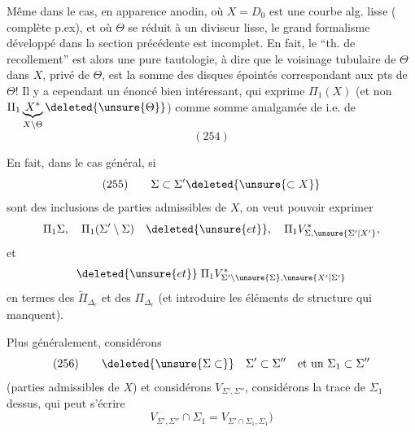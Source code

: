  Même dans le cas, en apparence anodin, où $X=D_0$ est une courbe alg.  lisse ( complète p.ex), et où $\Theta$ se réduit à un diviseur lisse, le grand formalisme développé dans la section précédente est incomplet. En fait, le ``th. de recollement'' est alors une pure tautologie,     à dire que le voisinage tubulaire de $\Theta$ dans $X$, privé de $\Theta$, est la somme des  disques épointés correspondant aux pts de $\Theta$! Il y a cependant un énoncé bien intéressant, qui exprime \deleted{$\unsure{\Pi}$} $\Pi_1(X)$ (et non $\Pi_1\underbrace{X^*}_{X\setminus\Theta}\deleted{\unsure{\Theta}}$) comme somme amalgamée de
i.e. de
\[
(254)
\]
\margin{--}


En fait, dans le cas général, si
\[
(255)\qquad\Sigma\subset\Sigma'\deleted{\unsure{\subset X}}
\]
sont des inclusions de parties admissibles de $X$, on veut pouvoir exprimer
\[
\Pi_1\Sigma,\quad\Pi_1(\Sigma'\setminus\Sigma)\quad\deleted{\unsure{et}},\quad
\Pi_1V^*_{\Sigma,\unsure{\Sigma'|X'}},
\]
et  
\[
\deleted{\unsure{et}}\;\Pi_1V^*_{\Sigma'\setminus\unsure{\Sigma},\unsure{X'|\Sigma'}}
\]
en termes des $\widetilde\Pi_{\Delta_r}$ et des $\Pi_{\Delta_r}$ (et  introduire les éléments de structure qui manquent).

Plus généralement, considérons
\[
(256)\qquad\deleted{\unsure{\Sigma\subset}}\quad\Sigma'\subset\Sigma''\quad\text{et un }\Sigma_1\subset\Sigma''
\]
 (parties admissibles de $X$) et considérons $V_{\Sigma',\Sigma''}$, considérons la trace de $\Sigma_1$ dessus, qui peut s'écrire
\[
V_{\Sigma',\Sigma''}\cap\Sigma_1=V_{\Sigma'\cap\Sigma_1,\Sigma_1})
\]

